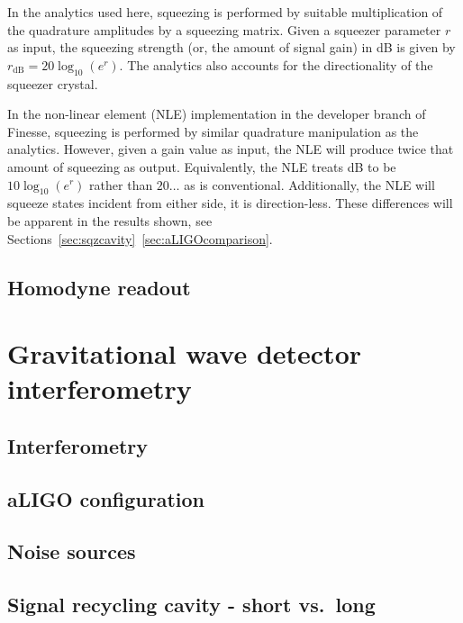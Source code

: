 \documentclass[aps,pra,superscriptaddress,reprint,nofootinbib]{revtex4-1}
\begin{document}
In the analytics used here, squeezing is performed by suitable multiplication of the quadrature amplitudes by a squeezing matrix. Given a squeezer parameter $r$ as input, the squeezing strength (or, the amount of signal gain) in dB is given by $r_{\mathrm{dB}} = 20 \log_{10}(e^r)$. The analytics also accounts for the directionality of the squeezer crystal.


In the non-linear element (NLE) implementation in the developer branch of Finesse, squeezing is performed by similar quadrature manipulation as the analytics. However, given a gain value as input, the NLE will produce twice that amount of squeezing as output. Equivalently, the NLE treats dB to be $10 \log_{10} (e^r)$ rather than $20 \ldots$ as is conventional. Additionally, the NLE will squeeze states incident from either side, it is direction-less. These differences will be apparent in the results shown, see Sections~\ref{sec:sqzcavity}~\ref{sec:aLIGOcomparison}.


\subsection{Homodyne readout}





\section{Gravitational wave detector interferometry}
\label{sec:gwIFO}

\subsection{Interferometry}


\subsection{aLIGO configuration}



\subsection{Noise sources}



\subsection{Signal recycling cavity - short vs.\ long}
\end{document}
